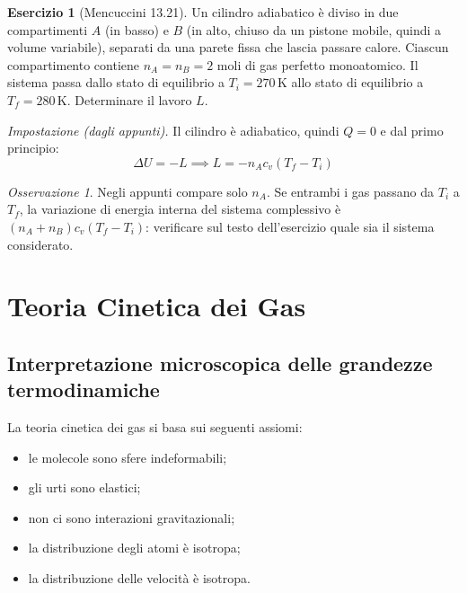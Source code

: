 \documentclass[11pt, a4paper, openright]{book}
\theoremstyle{plain}
\theoremstyle{definition}
\newtheorem{esercizio}[teorema]{Esercizio}
\theoremstyle{remark}
\newtheorem{osservazione}[teorema]{Osservazione}
\begin{document}
\begin{esercizio}[Mencuccini 13.21]
    Un cilindro adiabatico è diviso in due compartimenti $A$ (in basso) e $B$ (in alto, chiuso da un pistone mobile, quindi a volume variabile), separati da una parete fissa che lascia passare calore. Ciascun compartimento contiene $n_A = n_B = 2$ moli di gas perfetto monoatomico. Il sistema passa dallo stato di equilibrio a $T_i = 270\,\text{K}$ allo stato di equilibrio a $T_f = 280\,\text{K}$. Determinare il lavoro $L$.

    \textit{Impostazione (dagli appunti).} Il cilindro è adiabatico, quindi $Q = 0$ e dal primo principio:
    \begin{equation}
        \Delta U = -L \implies L = -n_Ac_v(T_f - T_i)
    \end{equation}
    \begin{osservazione}
        Negli appunti compare solo $n_A$. Se entrambi i gas passano da $T_i$ a $T_f$, la variazione di energia interna del sistema complessivo è $(n_A + n_B)c_v(T_f - T_i)$: verificare sul testo dell'esercizio quale sia il sistema considerato.
    \end{osservazione}
\end{esercizio}

\chapter{Teoria Cinetica dei Gas}
\section{Interpretazione microscopica delle grandezze termodinamiche}
La teoria cinetica dei gas si basa sui seguenti assiomi:
\begin{itemize}
    \item le molecole sono sfere indeformabili;
    \item gli urti sono elastici;
    \item non ci sono interazioni gravitazionali;
    \item la distribuzione degli atomi è isotropa;
    \item la distribuzione delle velocità è isotropa.
\end{itemize}
\end{document}
